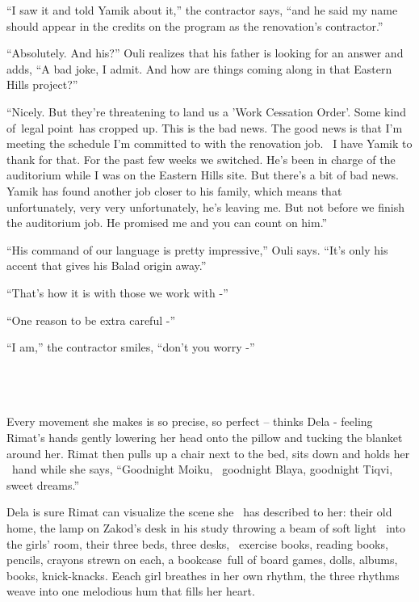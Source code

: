\documentclass[twoside,11pt]{book}
\begin{document}
``I saw it and told Yamik about it,'' the contractor says, ``and he said my name
should appear in the credits on the program as the renovation's contractor.''

``Absolutely. And his?'' Ouli realizes that his father is looking for an answer and adds,
``A bad joke, I admit. And how are things coming along in that Eastern Hills project?''

``Nicely. But they're threatening to land us a 'Work Cessation Order'. Some kind of~legal point~has cropped
up. This is the bad news. The good news is that I'm meeting the schedule I'm committed to with the renovation job. \ I
have Yamik to thank for that. For the past few weeks we switched. He's been in charge of the auditorium while I was on
the Eastern Hills site. But there's a bit of bad news. Yamik has found another job closer to his family, which means
that unfortunately, very very unfortunately, he's leaving me. But not before we finish the auditorium job. He promised
me and you can count on him.''

``His command of our language is pretty impressive,'' Ouli says. ``It's only his
accent that gives his Balad origin away.''

``That's how it is with those we work with -''

``One reason to be extra careful -''

``I am,'' the contractor smiles, ``don't you worry -''

~

\chapter{}

Every movement she makes is so precise, so perfect -- thinks Dela - feeling Rimat's hands gently lowering her head onto
the pillow and tucking the blanket around her. Rimat then pulls up a chair next to the bed, sits down and holds her
\ hand while she says, ``Goodnight Moiku, ~goodnight Blaya, goodnight Tiqvi, sweet dreams.''

Dela is sure Rimat can visualize the scene she \ has described to her: their old home, the lamp on Zakod's desk in his
study throwing a beam of soft light \ into the girls' room, their three beds, three desks, \ exercise books, reading
books, pencils, crayons strewn on each, a bookcase~full of board games, dolls, albums, books, knick-knacks. Eeach girl
breathes in her own rhythm, the three rhythms weave into one melodious hum that fills her heart.
\end{document}
